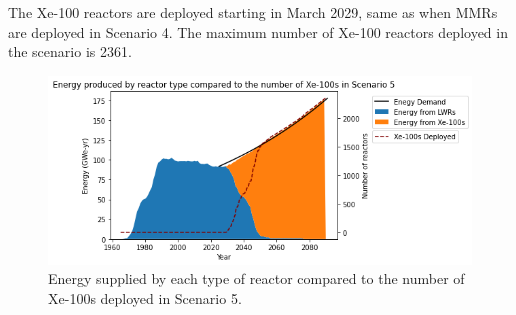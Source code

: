 The Xe-100 reactors are deployed starting in March 2029, same as when 
\glspl{MMR} are deployed in Scenario 4. The maximum number of Xe-100 
reactors deployed in the scenario is 2361. 

\begin{figure}
    \centering 
    \includegraphics[scale=0.5]{figures/energy_scenario5.png}
    \caption{Energy supplied by each type of reactor compared to the number of 
    Xe-100s deployed in Scenario 5.}
    \label{fig:energy_rx_5}
\end{figure}

